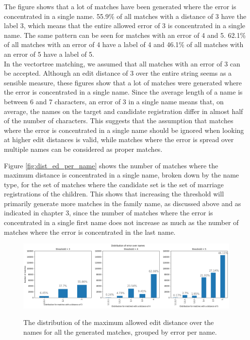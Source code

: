 The figure shows that a lot of matches have been generated where the error is concentrated in a single name. 55.9\% of all matches with a distance of 3 have the label 3, which means that the entire allowed error of 3 is concentrated in a single name. The same pattern can be seen for matches with an error of 4 and 5. 62.1\% of all matches with an error of 4 have a label of 4 and 46.1\% of all matches with an error of 5 have a label of 5.\\ 

In the vectortree matching, we assumed that all matches with an error of 3 can be accepted. Although an edit distance of 3 over the entire string seems as a sensible measure, these figures show that a lot of matches were generated where the error is concentrated in a single name. Since the average length of a name is between 6 and 7 characters, an error of 3 in a single name means that, on average, the names on the target and candidate registration differ in almost half of the number of characters. This suggests that the assumption that matches where the error is concentrated in a single name should be ignored when looking at higher edit distances is valid, while matches where the error is spread over multiple names can be considered as proper matches. 
\newline


Figure \ref{fig:dist_ed_per_name} shows the number of matches where the maximum distance is concentrated in a single name, broken down by the name type, for the set of matches where the candidate set is the set of marriage registrations of the children. This shows that increasing the threshold will primarily generate more matches in the family name, as discussed above and as indicated in chapter 3, since the number of matches where the error is concentrated in a single first name does not increase as much as the number of matches where the error is concentrated in the last name.


\begin{figure}
	\begin{center}
		\caption[Distribution of the maximum error over the names]{The distribution of the maximum allowed edit distance over the names for all the generated matches, grouped by error per name.}
		\centerline{\includegraphics[scale=0.45]{figures/distribution_max_error_over_names_all.png}}
		\label{fig:dist_ed_per_th}
	\end{center}
	
\end{figure}

